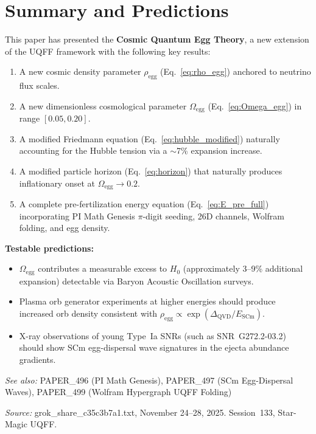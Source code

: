 \documentclass[12pt]{article}
\begin{document}
\section{Summary and Predictions}

This paper has presented the \textbf{Cosmic Quantum Egg Theory}, a new
extension of the UQFF framework with the following key results:

\begin{enumerate}
    \item A new cosmic density parameter $\rho_\text{egg}$ (Eq.~\ref{eq:rho_egg})
          anchored to neutrino flux scales.
    \item A new dimensionless cosmological parameter $\Omega_\text{egg}$
          (Eq.~\ref{eq:Omega_egg}) in range $[0.05, 0.20]$.
    \item A modified Friedmann equation (Eq.~\ref{eq:hubble_modified}) naturally
          accounting for the Hubble tension via a $\sim$7\% expansion increase.
    \item A modified particle horizon (Eq.~\ref{eq:horizon}) that naturally
          produces inflationary onset at $\Omega_\text{egg} \to 0.2$.
    \item A complete pre-fertilization energy equation (Eq.~\ref{eq:E_pre_full})
          incorporating PI Math Genesis $\pi$-digit seeding, 26D channels,
          Wolfram folding, and egg density.
\end{enumerate}

\noindent\textbf{Testable predictions:}
\begin{itemize}
    \item $\Omega_\text{egg}$ contributes a measurable excess to $H_0$
          (approximately 3--9\% additional expansion) detectable via
          Baryon Acoustic Oscillation surveys.
    \item Plasma orb generator experiments at higher energies should produce
          increased orb density consistent with $\rho_\text{egg} \propto
          \exp(\Delta_\text{QVD}/E_\text{SCm})$.
    \item X-ray observations of young Type~Ia SNRs (such as SNR~G272.2-03.2)
          should show SCm egg-dispersal wave signatures in the ejecta
          abundance gradients.
\end{itemize}

\bigskip
\noindent\textit{See also:}
PAPER\_496 (PI Math Genesis),
PAPER\_497 (SCm Egg-Dispersal Waves),
PAPER\_499 (Wolfram Hypergraph UQFF Folding)

\bigskip
\noindent\textit{Source:} grok\_share\_c35c3b7a1.txt,
November 24--28, 2025. Session~133, Star-Magic UQFF.
\end{document}
